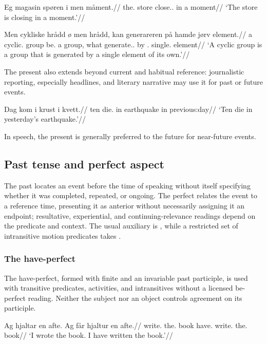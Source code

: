 \pex
\begingl
\gla Eg magasin spøren i men måment.//
\glb the.\Nt{} store close.\Pres{}.\Pass{} in a moment//
\glft `The store is closing in a moment.'//
\endgl
\xe

\pex
\begingl
\gla Men cykliske hrådd ø men hrådd, kan generareren på hamde jørv element.//
\glb a cyclic.\M{} group be.\Pres{} a group, what generate.\Pres{}.\Pass{} by \Refl{}.\M{} single.\M{} element//
\glft `A cyclic group is a group that is generated by a single element of its own.'//
\endgl
\xe

The present also extends beyond current and habitual reference: journalistic reporting, especially headlines, and literary narrative may use it for past or future events.

\pex
\begingl
\gla Dag kom i krust i kvett.//
\glb ten die.\Pres{} in earthquake in previous:day//
\glft `Ten die in yesterday's earthquake.'//
\endgl
\xe

In speech, the present is generally preferred to the future for near-future events.

\subsection{Past tense and perfect aspect}
\label{sec:perfect}

The past locates an event before the time of speaking without itself specifying whether it was completed, repeated, or ongoing. The perfect relates the event to a reference time, presenting it as anterior without necessarily assigning it an endpoint; resultative, experiential, and continuing-relevance readings depend on the predicate and context. The usual auxiliary is , while a restricted set of intransitive motion predicates takes .

\subsubsection{The have-perfect}

The have-perfect, formed with finite  and an invariable past participle, is used with transitive predicates, activities, and intransitives without a licensed be-perfect reading. Neither the subject nor an object controls agreement on its participle.

\pex
\begingl
\gla Ag hjaltar en afte. Ag får hjaltur en afte.//
\glb \First{}\Sg{} write.\Pst{} the.\M{} book \First{}\Sg{} have.\Pres{} write.\PstP{} the.\M{} book//
\glft `I wrote the book. I have written the book.'//
\endgl
\xe

